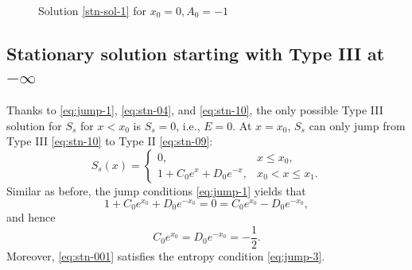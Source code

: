\documentclass[12pt]{article}
\theoremstyle{definition}
\theoremstyle{remark}
\numberwithin{equation}{section}
\begin{document}
\begin{figure}[htbp]
\centering
\caption{Solution \eqref{stn-sol-1} for $x_0=0, A_0=-1$}
\end{figure}



\subsection{Stationary solution starting with Type III at $ - \infty $}
\label{sec:stationary_second_kind}

Thanks to \eqref{eq:jump-1}, \eqref{eq:stn-04}, and \eqref{eq:stn-10}, the only possible Type III solution for $ S_s $ for $ x < x_0 $ is $ S_s = 0 $, i.e., $ E = 0 $. At $ x = x_0 $, $ S_s $ can only jump from Type III \eqref{eq:stn-10} to Type II \eqref{eq:stn-09}:
\begin{equation}
    \label{eq:stn-001}
    S_s(x) = \begin{cases}
        0, & x \leq x_0, \\
        1 + C_0 e^x + D_0 e^{-x}, & x_0 < x \leq x_1.
    \end{cases}
\end{equation}
Similar as before, the jump conditions \eqref{eq:jump-1} yields that 
\begin{equation}
    \label{eq:stn-002}
    1 + C_0 e^{x_0} + D_0 e^{-x_0} = 0 = C_0 e^{x_0} - D_0 e^{-x_0},
\end{equation}
and hence
\begin{equation}
    \label{eq:stn-003}
    C_0 e^{x_0} = D_0 e^{-x_0} = - \frac{1}{2}.
\end{equation}
Moreover, \eqref{eq:stn-001} satisfies the entropy condition \eqref{eq:jump-3}.
\end{document}
